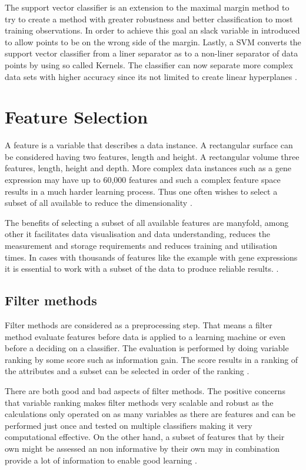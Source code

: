 The support vector classifier is an extension to the maximal margin method to try to create a method with greater robustness and better classification to most training observations. In order to achieve this goal an slack variable in introduced to allow points to be on the wrong side of the margin. Lastly, a SVM converts the support vector classifier from a liner separator as to  a non-liner separator of data points by using so called Kernels. The classifier can now separate more complex data sets with higher accuracy since its not limited to create linear hyperplanes \textcite{James:2014}.


\section{Feature Selection}

A feature is a variable that describes a data instance. A rectangular surface can be considered having two features, length and height. A rectangular volume three features, length, height and depth. More complex data instances such as a gene expression may have up to 60,000 features and such a complex feature space results in a much harder learning process. Thus one often wishes to select a subset of all available to reduce the dimensionality \parencite{guyon2003}.

The benefits of selecting a subset of all available features are manyfold, among other it facilitates data visualisation and data understanding, reduces the measurement and storage requirements and reduces training and utilisation times. In cases with thousands of features like the example with gene expressions it is essential to work with a subset of the data to produce reliable results. \parencite{guyon2003}.


\subsection{Filter methods}

Filter methods are considered as a preprocessing step. That means a filter method evaluate features before data is applied to a learning machine or even before a deciding on a classifier. The evaluation is performed by doing variable ranking by some score such as information gain. The score results in a ranking of the attributes and a subset can be selected in order of the ranking \parencite{guyon2003}.

There are both good and bad aspects of filter methods. The positive concerns that variable ranking makes filter methods very scalable and robust as the calculations only operated on as many variables as there are features and can be performed just once and tested on multiple classifiers making it very computational effective. On the other hand, a subset of features that by their own might be assessed an non informative by their own may in combination provide a lot of information to enable good learning \parencite{guyon2003}.


